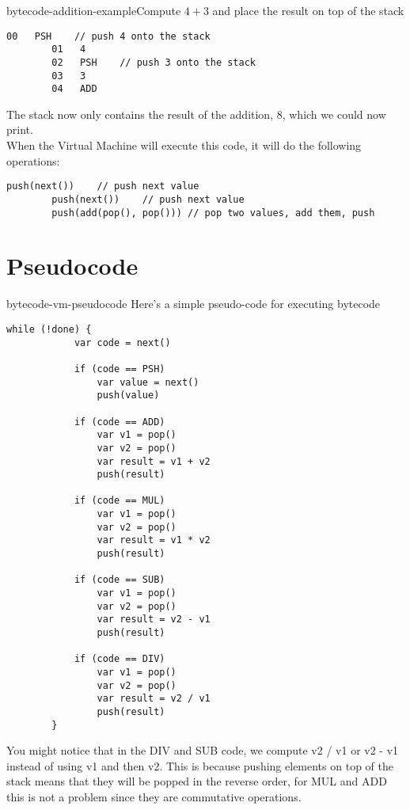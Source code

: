 \documentclass[preview]{standalone}
\begin{document}

\begin{snippetexample}{bytecode-addition-example}{Compute \(4+3\) and place the result on top of the stack}
    \begin{lstlisting}[style=generic]
        00   PSH    // push 4 onto the stack
        01   4
        02   PSH    // push 3 onto the stack
        03   3
        04   ADD
    \end{lstlisting}
    
    The stack now only contains the result of the addition, 8, which we could now print.
    \\
    When the Virtual Machine will execute this code, it will do the following operations:
    
    \begin{lstlisting}[style=generic]
        push(next())    // push next value
        push(next())    // push next value
        push(add(pop(), pop())) // pop two values, add them, push
    \end{lstlisting}
\end{snippetexample}

\section{Pseudocode}

\begin{snippet}{bytecode-vm-pseudocode}
    Here's a simple pseudo-code for executing bytecode
    
    \begin{lstlisting}[style=generic]
        while (!done) {
            var code = next()
        
            if (code == PSH)
                var value = next()
                push(value)
        
            if (code == ADD)
                var v1 = pop()
                var v2 = pop()
                var result = v1 + v2
                push(result)
        
            if (code == MUL)
                var v1 = pop()
                var v2 = pop()
                var result = v1 * v2
                push(result)
        
            if (code == SUB)
                var v1 = pop()
                var v2 = pop()
                var result = v2 - v1
                push(result)
        
            if (code == DIV)
                var v1 = pop()
                var v2 = pop()
                var result = v2 / v1
                push(result)
        }
    \end{lstlisting}
    
    You might notice that in the DIV and SUB code, we compute v2 / v1 or v2 - v1 instead of using v1 and then v2.
    This is because pushing elements on top of the stack means that they will be popped in the reverse order, for MUL and ADD
    this is not a problem since they are commutative operations.
\end{snippet}
\end{document}
